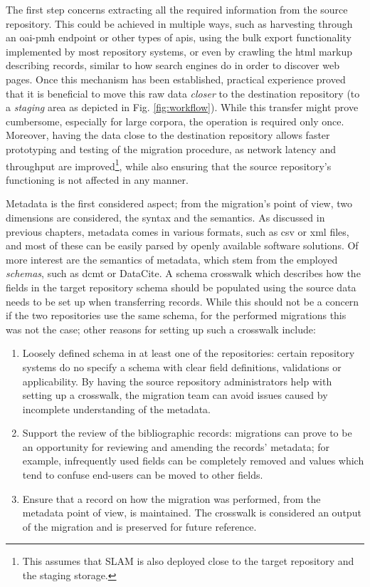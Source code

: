 The first step concerns extracting all the required information from the source repository. This could be achieved in multiple ways, such as harvesting through an \gls{oai}-\gls{pmh} endpoint or other types of \glspl{api}, using the bulk export functionality implemented by most repository systems, or even by crawling the \gls{html} markup describing records, similar to how search engines do in order to discover web pages. Once this mechanism has been established, practical experience proved that it is beneficial to move this raw data \emph{closer} to the destination repository (to a \emph{staging} area as depicted in Fig. \ref{fig:workflow}). While this transfer might prove cumbersome, especially for large corpora, the operation is required only once. Moreover, having the data close to the destination repository allows faster prototyping and testing of the migration procedure, as network latency and throughput are improved\footnote{This assumes that SLAM is also deployed close to the target repository and the staging storage.}, while also ensuring that the source repository's functioning is not affected in any manner.

Metadata is the first considered aspect; from the migration's point of view, two dimensions are considered, the syntax and the semantics. As discussed in previous chapters, metadata comes in various formats, such as \gls{csv} or \gls{xml} files, and most of these can be easily parsed by openly available software solutions. Of more interest are the semantics of metadata, which stem from the employed \emph{schemas}, such as \gls{dcmt} or DataCite. A schema crosswalk which describes how the fields in the target repository schema should be populated using the source data needs to be set up when transferring records. While this should not be a concern if the two repositories use the same schema, for the performed migrations this was not the case; other reasons for setting up such a crosswalk include:
\begin{enumerate}
    \item Loosely defined schema in at least one of the repositories: certain repository systems do no specify a schema with clear field definitions, validations or applicability. By having the source repository administrators help with setting up a crosswalk, the migration team can avoid issues caused by incomplete understanding of the metadata.
    \item Support the review of the bibliographic records: migrations can prove to be an opportunity for reviewing and amending the records' metadata; for example, infrequently used fields can be completely removed and values which tend to confuse end-users can be moved to other fields.
    \item Ensure that a record on how the migration was performed, from the metadata point of view, is maintained. The crosswalk is considered an output of the migration and is preserved for future reference. 
\end{enumerate}

